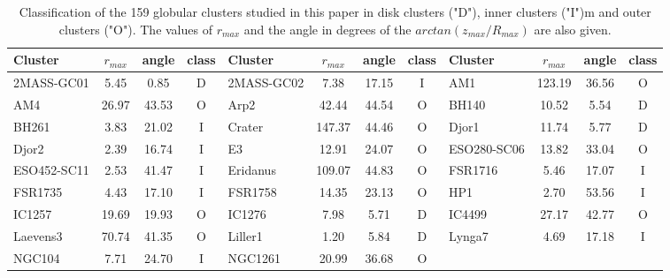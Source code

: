         \begin{table}
            \caption[]{Classification of the 159 globular clusters studied in this paper in disk clusters ("D"), inner clusters ("I")m and outer clusters ("O"). The values of $r_{max}$ and the angle in degrees of the $arctan(z_{max}/R_{max})$ are also given.}\label{classification}
            \small
            \begin{tabular}{l | c | c | c | l | c | c | c | l | c | c | c}
            \hline
                Cluster &    $r_{max}$ &  angle & class & Cluster &    $r_{max}$ &  angle & class & Cluster &    $r_{max}$ &  angle & class \\
                        \hline \hline
            2MASS-GC01 &   5.45 &   0.85 &              D &
            2MASS-GC02 &   7.38 &  17.15 &              I &
                    AM1 & 123.19 &  36.56 &              O \\
                    AM4 &  26.97 &  43.53 &              O &
                    Arp2 &  42.44 &  44.54 &              O &
                    BH140 &  10.52 &   5.54 &              D \\
                    BH261 &   3.83 &  21.02 &              I &
                Crater & 147.37 &  44.46 &              O &
                    Djor1 &  11.74 &   5.77 &              D \\
                    Djor2 &   2.39 &  16.74 &              I &
                    E3 &  12.91 &  24.07 &              O &
            ESO280-SC06 &  13.82 &  33.04 &              O \\
            ESO452-SC11 &   2.53 &  41.47 &              I &
                Eridanus & 109.07 &  44.83 &              O &
                FSR1716 &   5.46 &  17.07 &              I \\
                FSR1735 &   4.43 &  17.10 &              I &
                FSR1758 &  14.35 &  23.13 &              O &
                    HP1 &   2.70 &  53.56 &              I \\
                IC1257 &  19.69 &  19.93 &              O &
                IC1276 &   7.98 &   5.71 &              D &
                IC4499 &  27.17 &  42.77 &              O \\
                Laevens3 &  70.74 &  41.35 &              O &
                Liller1 &   1.20 &   5.84 &              D &
                Lynga7 &   4.69 &  17.18 &              I \\
                NGC104 &   7.71 &  24.70 &              I &
                NGC1261 &  20.99 &  36.68 &              O &

\end{tabular}
\end{table}
